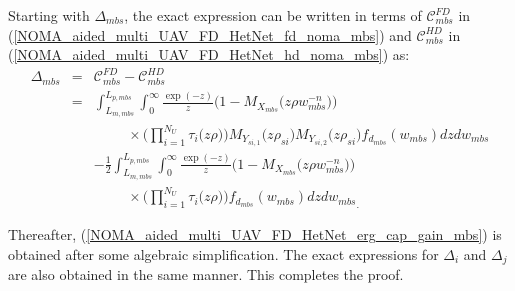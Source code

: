 Starting with $\Delta_{mbs}$, the exact expression can be written in terms of $\mathcal{C}_{mbs}^{FD}$ in (\ref{NOMA_aided_multi_UAV_FD_HetNet_fd_noma_mbs}) and $\mathcal{C}_{mbs}^{HD}$ in (\ref{NOMA_aided_multi_UAV_FD_HetNet_hd_noma_mbs}) as:
\begin{eqnarray} \label{NOMA_aided_multi_UAV_FD_HetNet_corollary_erg_cap_gain_proof_eq1}
\Delta_{mbs} & = & \mathcal{C}_{mbs}^{FD} - \mathcal{C}_{mbs}^{HD} \nonumber \\
 & = & \int_{L_{m,mbs}}^{L_{p,mbs}} \int_{0}^{\infty} \frac{\exp(-z)}{z} \Bigg(1-M_{X_{mbs}}\Big(z\rho  w_{mbs}^{-n}\Big)\Bigg) \nonumber \\
 & & \hspace{1cm} \times \Bigg( \prod_{i=1}^{N_U} \tau_i\big(z\rho\big) \Bigg) M_{Y_{si,1}}\big(z\rho_{si}\big) M_{Y_{si,2}}\big(z\rho_{si} \big) f_{d_{mbs}}(w_{mbs}) dz dw_{mbs} \nonumber \\
 & &  - \frac{1}{2} \int_{L_{m,mbs}}^{L_{p,mbs}} \int_{0}^{\infty} \frac{\exp(-z)}{z} \Bigg(1-M_{X_{mbs}}\Big(z\rho  w_{mbs}^{-n}\Big)\Bigg) \nonumber \\
 & & \hspace{1cm} \times \Bigg( \prod_{i=1}^{N_U} \tau_i\big(z\rho\big) \Bigg) f_{d_{mbs}}(w_{mbs}) {dz dw_{mbs}}_.
\end{eqnarray}

Thereafter, (\ref{NOMA_aided_multi_UAV_FD_HetNet_erg_cap_gain_mbs}) is obtained after some algebraic simplification. The exact expressions for $\Delta_{i}$ and $\Delta_{j}$ are also obtained in the same manner. This completes the proof.
